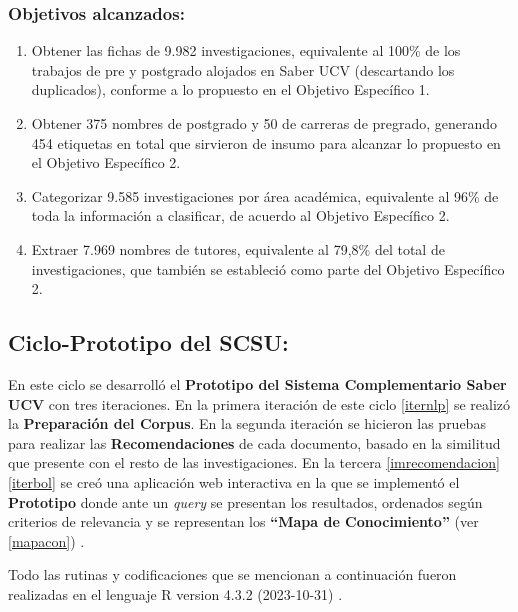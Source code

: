 \documentclass[
  12pt,
  openany]{book}
\begin{document}
\hypertarget{objetivos-alcanzados}{%
\subsubsection{Objetivos alcanzados:}\label{objetivos-alcanzados}}

\begin{enumerate}
\def\labelenumi{\arabic{enumi}.}
\item
  Obtener las fichas de 9.982 investigaciones, equivalente al 100\% de los trabajos de pre y postgrado alojados en Saber UCV (descartando los duplicados), conforme a lo propuesto en el Objetivo Específico 1.
\item
  Obtener 375 nombres de postgrado y 50 de carreras de pregrado, generando 454 etiquetas en total que sirvieron de insumo para alcanzar lo propuesto en el Objetivo Específico 2.
\item
  Categorizar 9.585 investigaciones por área académica, equivalente al 96\% de toda la información a clasificar, de acuerdo al Objetivo Específico 2.
\item
  Extraer 7.969 nombres de tutores, equivalente al 79,8\% del total de investigaciones, que también se estableció como parte del Objetivo Específico 2.
\end{enumerate}

\newpage

\hypertarget{desarrollociclos3}{%
\subsection{Ciclo-Prototipo del SCSU:}\label{desarrollociclos3}}

En este ciclo se desarrolló el \textbf{Prototipo del Sistema Complementario Saber UCV} con tres iteraciones. En la primera iteración de este ciclo \ref{iternlp} se realizó la \textbf{Preparación del Corpus}. En la segunda iteración se hicieron las pruebas para realizar las \textbf{Recomendaciones} de cada documento, basado en la similitud que presente con el resto de las investigaciones. En la tercera \ref{imrecomendacion} \ref{iterbol} se creó una aplicación web interactiva en la que se implementó el \textbf{Prototipo} donde ante un \emph{query} se presentan los resultados, ordenados según criterios de relevancia y se representan los \textbf{``Mapa de Conocimiento''} (ver \ref{mapacon}) .

Todo las rutinas y codificaciones que se mencionan a continuación fueron realizadas en el lenguaje R version 4.3.2 (2023-10-31) \citep{R}.
\end{document}
